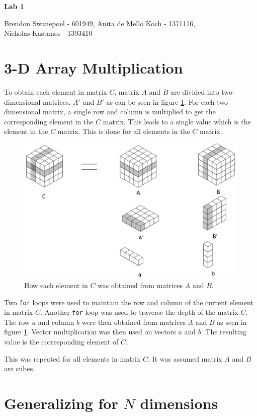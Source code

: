 \documentclass[a4paper,10pt]{article}
\begin{document}
{\LARGE{\centerline{\bf Lab 1}}}
\Large{Brendon Swanepoel - 601949, Anita de Mello Koch - 1371116, \\ Nicholas Kastanos - 1393410}

\section{3-D Array Multiplication}

To obtain each element in matrix $C$, matrix $A$ and $B$ are divided into two-dimensional matrices, $A'$ and $B'$ as can be seen in figure \ref{3DMult}.
For each two-dimensional matrix, a single row and column is multiplied to get the corresponding element in the $C$ matrix.
This leads to a single value which is the element in the $C$ matrix.
This is done for all elements in the $C$ matrix.

\begin{figure}[h]
\centering
\includegraphics[scale=0.15]{3D.jpg}
\caption{How each element in $C$ was obtained from matrices $A$ and $B$.}\label{3DMult}
\end{figure}

Two \texttt{for} loops were used to maintain the row and column of the current element in matrix $C$.
Another \texttt{for} loop was used to traverse the depth of the matrix $C$.
The row $a$ and column $b$ were then obtained from matrices $A$ and $B$ as seen in figure \ref{3DMult}.
Vector multiplication was then used on vectors $a$ and $b$.
The resulting value is the corresponding element of $C$.

This was repeated for all elements in matrix $C$.
It was assumed matrix $A$ and $B$ are cubes.

\section{Generalizing for $N$ dimensions}
\end{document}
